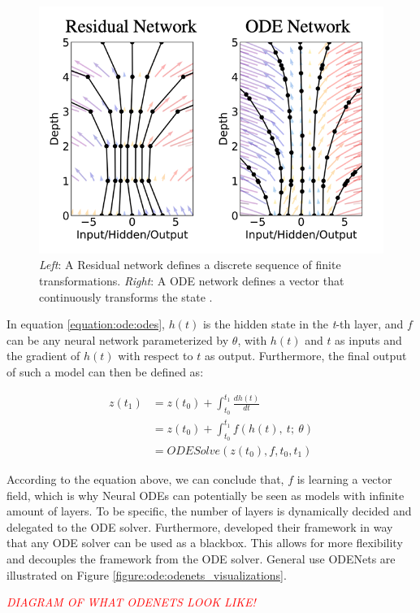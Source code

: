 \begin{figure}[ht]
      \centering
      \includegraphics[width=0.7\columnwidth]{figures/resnet_vs_odes.png}
      \caption{\emph{Left}: A Residual network defines a discrete sequence of finite transformations. \emph{Right}: A ODE network defines a vector that continuously transforms the state \citep{chen2018neural}.}
      \label{figure:ode:resnet_vs_ode}
\end{figure}

In equation \ref{equation:ode:odes}, $ h(t) $ is the hidden state in the \emph{t}-th layer, and $ f $ can be any neural network parameterized by $ \theta $, with $ h(t) $ and $ t $ as inputs and the gradient of $ h(t) $ with respect to $ t $ as output. Furthermore, the final output of such a model can then be defined as:

\begin{align}
    z(t_1) & = z(t_0) + \int_{t_0}^{t_1} \frac{d h(t)}{d t} \\
    & = z(t_0) + \int_{t_0}^{t_1} f(h(t), \ t; \ \theta ) \\
    & = ODESolve(z(t_0), f, t_0, t_1)
\end{align}

According to the equation above, we can conclude that, $ f $ is learning a vector field, which is why Neural ODEs can potentially be seen as models with infinite amount of layers. To be specific, the number of layers is dynamically decided and delegated to the ODE solver. Furthermore, \citet{chen2018neural} developed their framework in way that any ODE solver can be used as a blackbox. This allows for more flexibility and decouples the framework from the ODE solver. General use ODENets are illustrated on Figure \ref{figure:ode:odenets_visualizations}.

\begin{center}
    \emph{\textcolor{red}{DIAGRAM OF WHAT ODENETS LOOK LIKE!}}
\end{center}

